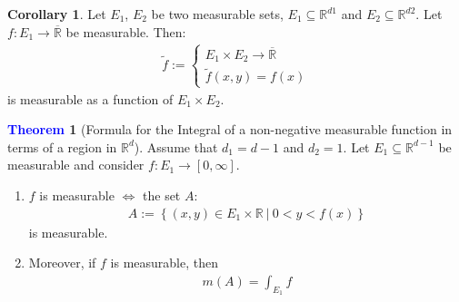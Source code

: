 \documentclass[11pt]{article}
\theoremstyle{definition}
\newcommand{\rd}[0]{\mathbb{R}^d}
\newcommand{\bb}[1]{\mathbb{#1}}
\newcommand{\sets}[2]{ \left\{ #1\ |\ #2 \right\}}
\newtheorem{theorem}{\textcolor{blue}{Theorem}}
\newtheorem{corollary}{Corollary}
\theoremstyle{definition}
\theoremstyle{remark}
\begin{document}
\begin{corollary}
	Let $E_1$, $E_2$ be two measurable sets, $E_1 \subseteq \bb{R}^{d1}$ and $E_2 \subseteq \bb{R}^{d2}$. Let $f: E_1 \rightarrow \overline{\bb{R}}$ be measurable. Then: 
	\begin{align*}
		\widetilde{f} := 
		\begin{cases}
			 E_1 \times E_2 \rightarrow \overline{\bb{R}} \\
			 \widetilde{f}(x,y) = f(x) 
		\end{cases}
	\end{align*}
	is measurable as a function of $E_1 \times E_2$. 
\end{corollary}

\begin{theorem}[Formula for the Integral of a non-negative measurable function in terms of a region in $\rd$] 
	Assume that $d_1 = d - 1$ and $d_2 = 1$. Let $E_1 \subseteq \bb{R}^{d-1}$ be measurable and consider $f: E_1 \rightarrow [0, \infty]$. 
	\begin{enumerate}[noitemsep]
		\item $f$ is measurable $\iff$ the set $A$: 
	\begin{align*}
		A := \sets{(x,y) \in E_1 \times \bb{R}}{0 < y < f(x)}	
	\end{align*}
	is measurable. 
	\item Moreover, if $f$ is measurable, then 
	\begin{align}
		m(A) = \int_{E_1} f 
	\end{align}
	\end{enumerate}	
\end{theorem}
\end{document}
